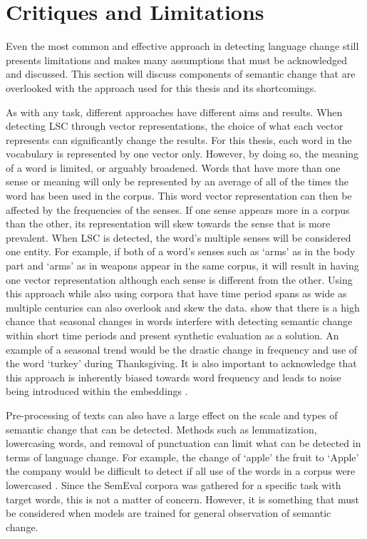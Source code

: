 \section{Critiques and Limitations}
\label{sec:critiques}

Even the most common and effective approach in detecting language change still presents limitations and makes many assumptions that must be acknowledged and discussed. This section will discuss components of semantic change that are overlooked with the approach used for this thesis and its shortcomings. 

As with any task, different approaches have different aims and results. When detecting LSC through vector representations, the choice of what each vector represents can significantly change the results. For this thesis, each word in the vocabulary is represented by one vector only. However, by doing so, the meaning of a word is limited, or arguably broadened. Words that have more than one sense or meaning will only be represented by an average of all of the times the word has been used in the corpus. This word vector representation can then be affected by the frequencies of the senses. If one sense appears more in a corpus than the other, its representation will skew towards the sense that is more prevalent.  When LSC is detected, the word’s multiple senses will be considered one entity. For example, if both of a word’s senses such as ‘arms’ as in the body part and ‘arms’ as in weapons appear in the same corpus, it will result in having one vector representation although each sense is different from the other. Using this approach while also using corpora that have time period spans as wide as multiple centuries can also overlook and skew the data. \citet{shoemark-etal-2019-room} show that there is a high chance that seasonal changes in words interfere with detecting semantic change within short time periods and present synthetic evaluation as a solution. An example of a seasonal trend would be the drastic change in frequency and use of the word `turkey' during Thanksgiving. It is also important to acknowledge that this approach is inherently biased towards word frequency and leads to noise being introduced within the embeddings \citep{dubossarsky-etal-2017-outta, kaiser-etal-2020-ims, schlechtweg-etal-2020-semeval}.

Pre-processing of texts can also have a large effect on the scale and types of semantic change that can be detected. Methods such as lemmatization, lowercasing words, and removal of punctuation can limit what can be detected in terms of language change. For example, the change of `apple' the fruit to `Apple' the company would be difficult to detect if all use of the words in a corpus were lowercased \citep{tahmasebi-survey2018}. Since the SemEval corpora was gathered for a specific task with target words, this is not a matter of concern. However, it is something that must be considered when models are trained for general observation of semantic change.

